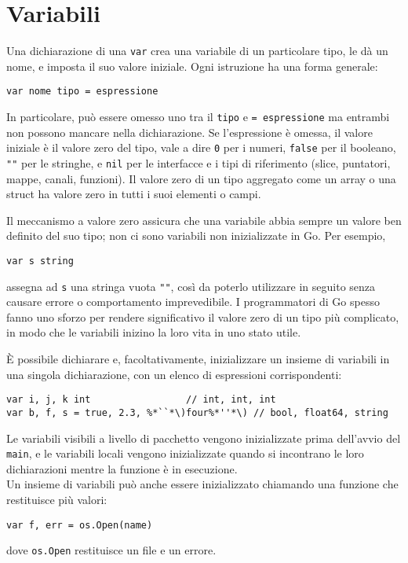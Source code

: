 \section{Variabili}
\label{sec:variabili}%
Una dichiarazione di una \verb|var| crea una variabile di un particolare tipo, le dà un nome, e imposta il suo valore iniziale.
Ogni istruzione ha una forma generale:
\begin{lstlisting}[label={lst:lstlisting1-3.1}]
var nome tipo = espressione
\end{lstlisting}
In particolare, può essere omesso uno tra il \verb|tipo| e \verb|= espressione| ma entrambi non possono mancare nella dichiarazione.
Se l'espressione è omessa, il valore iniziale è il valore zero del tipo, vale a dire \verb|0| per i numeri, \verb|false| per il booleano, \verb|""| per le stringhe, e \verb|nil| per le interfacce e i tipi di riferimento (slice, puntatori, mappe, canali, funzioni).
Il valore zero di un tipo aggregato come un array o una struct ha valore zero in tutti i suoi elementi o campi.

Il meccanismo a valore zero assicura che una variabile abbia sempre un valore ben definito del suo tipo;
non ci sono variabili non inizializzate in Go.
Per esempio,
\begin{lstlisting}[frame=single,label={lst:lstlisting1-3.2}]
var s string
\end{lstlisting}
assegna ad \verb|s| una stringa vuota \verb|""|, così da poterlo utilizzare in seguito senza causare errore o comportamento imprevedibile.
I programmatori di Go spesso fanno uno sforzo per rendere significativo il valore zero di un tipo più complicato, in modo che le variabili inizino la loro vita in uno stato utile.

È possibile dichiarare e, facoltativamente, inizializzare un insieme di variabili in una singola dichiarazione, con un elenco di espressioni corrispondenti:
\begin{lstlisting}[frame=single, label={lst:lstlisting1-3.3}]
var i, j, k int                 // int, int, int
var b, f, s = true, 2.3, %*``*\)four%*''*\)	// bool, float64, string
\end{lstlisting}
Le variabili visibili a livello di pacchetto vengono inizializzate prima dell'avvio del \verb|main|, e le variabili locali vengono inizializzate quando si incontrano le loro dichiarazioni mentre la funzione è in esecuzione.\\
Un insieme di variabili può anche essere inizializzato chiamando una funzione che restituisce più valori:
\begin{lstlisting}[frame=single, label={lst:lstlisting1-3.4}]
var f, err = os.Open(name)
\end{lstlisting}
dove \verb|os.Open| restituisce un file e un errore.


